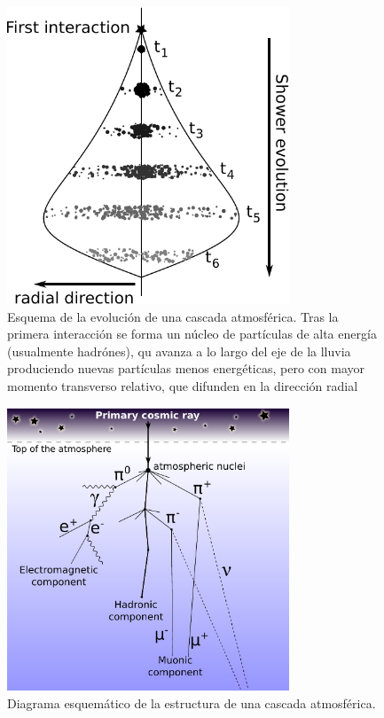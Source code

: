 %
\begin{figure}[ht]
\begin{center}
\includegraphics[width=0.75\textwidth]{fig/EASAuger/lluvia1_english.pdf}
\caption{Esquema de la evolución de una cascada atmosférica. Tras la primera interacción se forma un núcleo de partículas de alta energía (usualmente hadrónes), qu avanza a lo largo del eje de la lluvia produciendo nuevas partículas menos energéticas, pero con mayor momento transverso relativo, que difunden en la dirección radial}
\label{fig:lluvia1}
\end{center}
\end{figure}
%
%
\begin{figure}[ht]
\begin{center}
\includegraphics[width=0.75\textwidth]{fig/EASAuger/showerSchema_english.pdf}
\caption{Diagrama esquemático de la estructura de una cascada atmosférica.}
\label{fig:showerSchema}
\end{center}
\end{figure}
%

